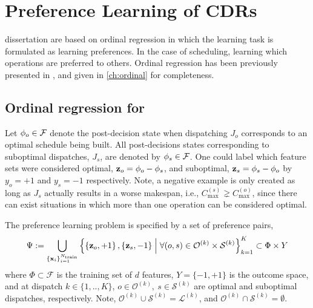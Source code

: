 
\chapter{Preference Learning of CDRs}\label{ch:prefmodels} 
 dissertation are based on ordinal regression in which the learning task is formulated as learning preferences. In the case of scheduling, learning which operations are preferred to others. Ordinal regression has been previously presented in \cite{Ru06:PPSN}, and given in \cref{ch:ordinal} for completeness. 

\section{Ordinal regression for \jsp}
Let ${\mathbf{\phi}}_{o}\in\mathcal{F}$ denote the post-decision state when dispatching $J_o$ corresponds to an optimal schedule being built. All post-decisions states corresponding to suboptimal dispatches, $J_s$, are denoted by ${\mathbf{\phi}}_{s}\in\mathcal{F}$. One could label which feature sets were considered optimal, $\mathbf{z}_{o}={\mathbf{\phi}}_{o}-{\mathbf{\phi}}_{s}$, and suboptimal, $\mathbf{z}_{s}={\mathbf{\phi}}_{s}-{\mathbf{\phi}}_{o}$ by $y_o=+1$ and $y_s=-1$ respectively. 
Note, a negative example is only created as long as $J_s$ actually results in a worse makespan, i.e., $C_{\max}^{(s)}\gneq C_{\max}^{(o)}$, since there can exist situations in which more than one operation can be considered optimal.

The preference learning problem is specified by a set of preference pairs,
\begin{equation}\label{eq:\Psi:jsp}
	\Psi := \bigcup_{\{\vec{x}_i\}_{i=1}^{N_{\text{train}}}}
    \condset{
        \left\{\vec{z}_o,+1\right\},\left\{\vec{z}_s,-1\right\}}{\forall (o,s) 
        \in \mathcal{O}^{(k)} \times \mathcal{S}^{(k)}}_{k=1}^K 
    \subset \Phi\times Y 
\end{equation}
where $\Phi\subset\mathcal{F}$ is the training set of $d$ features, 
$Y=\{-1,+1\}$ is the outcome space, and at dispatch $k\in\{1,..,K\}$, 
$o\in\mathcal{O}^{(k)},~s\in \mathcal{S}^{(k)}$
are optimal and suboptimal dispatches, respectively.
Note, $\mathcal{O}^{(k)}\cup\mathcal{S}^{(k)}=\mathcal{L}^{(k)}$, and 
$\mathcal{O}^{(k)}\cap\mathcal{S}^{(k)}=\emptyset$. 

